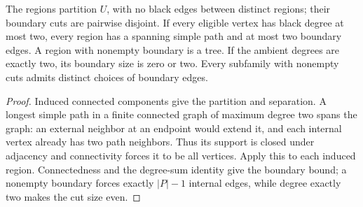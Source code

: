 \begin{theorem}
  \label{thm:lowerbounds-algebraic-region-paths}
  \leanok
  The regions partition $U$, with no black edges between distinct regions;
  their boundary cuts are pairwise disjoint. If every eligible vertex has
  black degree at most two, every region has a spanning simple path and
  at most two boundary edges. A region with nonempty boundary is a tree.
  If the ambient degrees are exactly two, its boundary size is zero or two.
  Every subfamily with nonempty cuts admits distinct choices of boundary edges.
\end{theorem}
\begin{proof}
  \leanok
  Induced connected components give the partition and separation.
  A longest simple path in a finite connected graph of maximum degree two
  spans the graph: an external neighbor at an endpoint would extend it,
  and each internal vertex already has two path neighbors. Thus its support
  is closed under adjacency and connectivity forces it to be all vertices.
  Apply this to each induced region. Connectedness and the degree-sum
  identity give the boundary bound; a nonempty boundary forces exactly
  $|P|-1$ internal edges, while degree exactly two makes the cut size even.
\end{proof}

